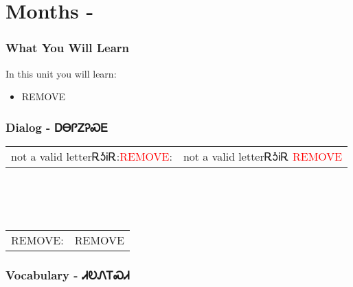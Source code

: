 \chapter{Months - }
\subsection{What You Will Learn}
In this unit you will learn:
\begin{itemize}
\item REMOVE
\end{itemize}\newpage

\newpage\subsection{Dialog - ᎠᎾᎵᏃᎮᏍᎬ}
\begin{tabular}{p{2cm} p{11cm}}
not a valid letterᎡᎼᎥᎡ:\newline \textcolor{red}{REMOVE}: & not a valid letterᎡᎼᎥᎡ 
\newline\textcolor{red}{REMOVE}\\
\end{tabular}
\\
\\
\\
\noindent\begin{tabular}{p{2cm} p{11cm}}REMOVE: & REMOVE\\
\end{tabular}
\vfill\newpage\subsection{Vocabulary - ᏗᎧᏁᎢᏍᏗ 
}
